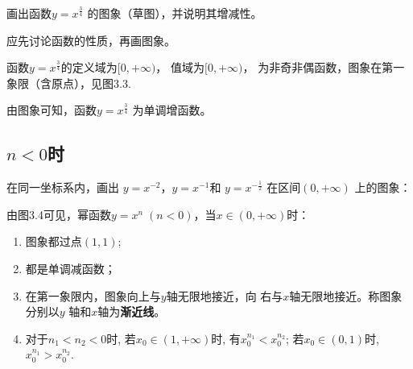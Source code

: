 \begin{example}
画出函数$y=x^{\tfrac{3}{4}}$
的图象（草图），并说明其增减性。    
\end{example}

\begin{solution}
    应先讨论函数的性质，再画图象。

函数$y=x^{\tfrac{3}{4}}$的定义域为$[0,+\infty)$，
值域为$[0,+\infty)$，
为非奇非偶函数，图象在第一象限（含原点），见图3.3.

由图象可知，函数$y=x^{\tfrac{3}{4}}$
为单调增函数。
\end{solution}

\subsection{$n<0$时}
在同一坐标系内，画出
$y=x^{-2}$，$y=x^{-1}$和
$y=x^{-\tfrac{1}{2}}$
在区间$(0,+\infty)$
上的图象：

\begin{figure}[htp]
    \centering
{}
    \caption{}
\end{figure}

由图3.4可见，幂函数$y=x^n\; (n<0)$，当$x\in(0,+\infty)$时：
\begin{enumerate}[(1)]
    \item 图象都过点$(1,1)$;
    \item 都是单调减函数；
    \item 在第一象限内，图象向上与$y$轴无限地接近，向
    右与$x$轴无限地接近。称图象分别以$y$
    轴和$x$轴为\textbf{渐近线}。
    \item 对于$n_1<n_2<0$时, 若$x_0\in(1,+\infty)$时, 有$x_0^{n_1}<x_0^{n_2}$; 若$x_0\in(0,1)$时, $x_0^{n_1}>x_0^{n_2}$.
\end{enumerate}

